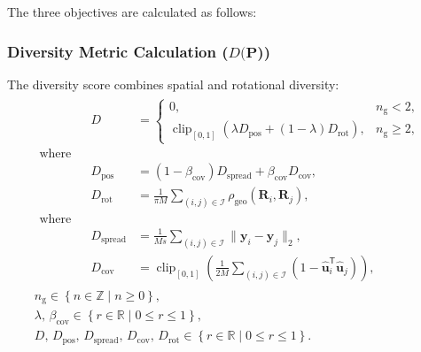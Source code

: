 The three objectives are calculated as follows: 
\subsubsection{Diversity Metric Calculation ($D(\mathbf{P}$))}

The diversity score combines spatial and rotational diversity:
\begin{equation}
    \label{eq:grasp_diversity}
    \begin{gathered}
        \begin{aligned}
            && D &=
            \begin{cases}
                0, & n_{\mathrm{g}} < 2,\\[2pt]
                \operatorname{clip}_{[0,1]}
                \!\left(
                    \lambda D_{\mathrm{pos}}
                    + (1-\lambda) D_{\mathrm{rot}}
                \right), & n_{\mathrm{g}} \geq 2,
            \end{cases}
            \\[6pt]
            \text{where} &&
            \\
            && D_{\mathrm{pos}}
            &=
            (1-\beta_{\mathrm{cov}}) D_{\mathrm{spread}}
            + \beta_{\mathrm{cov}} D_{\mathrm{cov}},
            \\[3pt]
            && D_{\mathrm{rot}}
            &=
            \frac{1}{\pi M}
            \sum_{(i,j)\in\mathcal{I}}
            \rho_{\mathrm{geo}}(\mathbf{R}_{i},\mathbf{R}_{j}),
            \\[6pt]
            \text{where} &&
            \\
            && D_{\mathrm{spread}}
            &=
            \frac{1}{Ms}
            \sum_{(i,j)\in\mathcal{I}}
            \|\mathbf{y}_{i}-\mathbf{y}_{j}\|_{2},
            \\[3pt]
            && D_{\mathrm{cov}}
            &=
            \operatorname{clip}_{[0,1]}
            \!\left(
                \frac{1}{2M}
                \sum_{(i,j)\in\mathcal{I}}
                \left(
                    1-\hat{\mathbf{u}}_{i}^{\mathsf{T}}\hat{\mathbf{u}}_{j}
                \right)
            \right),
        \end{aligned}
        \\[6pt]
        n_{\mathrm{g}} \in \left\{ n \in \mathbb{Z} \mid n \ge 0 \right\},
        \\[2pt]
        \lambda,\, \beta_{\mathrm{cov}}
        \in \left\{ r \in \mathbb{R} \mid 0 \le r \le 1 \right\},
        \\[2pt]
        D,\, D_{\mathrm{pos}},\, D_{\mathrm{spread}},\,
        D_{\mathrm{cov}},\, D_{\mathrm{rot}}
        \in \left\{ r \in \mathbb{R} \mid 0 \le r \le 1 \right\}.
    \end{gathered}
\end{equation}

